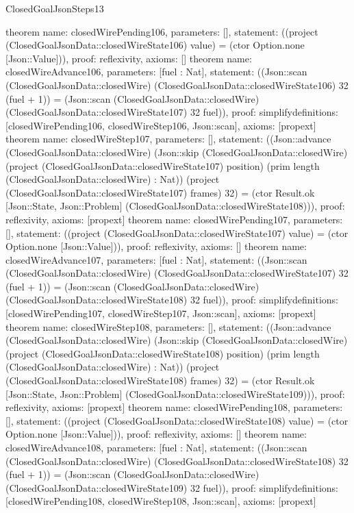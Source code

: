 \begin{lexlean}{ClosedGoalJsonSteps13}
\begin{semanticmodule}
{}
theorem{
 name: closedWirePending106, parameters: [],
 statement: ((project (ClosedGoalJsonData::closedWireState106) value) = (ctor Option.none [Json::Value])), proof: reflexivity{}, axioms: []
}
theorem{
 name: closedWireAdvance106, parameters: [fuel : Nat],
 statement: ((Json::scan (ClosedGoalJsonData::closedWire) (ClosedGoalJsonData::closedWireState106) 32 (fuel + 1)) = (Json::scan (ClosedGoalJsonData::closedWire) (ClosedGoalJsonData::closedWireState107) 32 fuel)), proof: simplify{definitions: [closedWirePending106, closedWireStep106, Json::scan]}, axioms: [propext]
}
theorem{
 name: closedWireStep107, parameters: [],
 statement: ((Json::advance (ClosedGoalJsonData::closedWire) (Json::skip (ClosedGoalJsonData::closedWire) (project (ClosedGoalJsonData::closedWireState107) position) (prim length (ClosedGoalJsonData::closedWire) : Nat)) (project (ClosedGoalJsonData::closedWireState107) frames) 32) = (ctor Result.ok [Json::State, Json::Problem] (ClosedGoalJsonData::closedWireState108))), proof: reflexivity{}, axioms: [propext]
}
theorem{
 name: closedWirePending107, parameters: [],
 statement: ((project (ClosedGoalJsonData::closedWireState107) value) = (ctor Option.none [Json::Value])), proof: reflexivity{}, axioms: []
}
theorem{
 name: closedWireAdvance107, parameters: [fuel : Nat],
 statement: ((Json::scan (ClosedGoalJsonData::closedWire) (ClosedGoalJsonData::closedWireState107) 32 (fuel + 1)) = (Json::scan (ClosedGoalJsonData::closedWire) (ClosedGoalJsonData::closedWireState108) 32 fuel)), proof: simplify{definitions: [closedWirePending107, closedWireStep107, Json::scan]}, axioms: [propext]
}
theorem{
 name: closedWireStep108, parameters: [],
 statement: ((Json::advance (ClosedGoalJsonData::closedWire) (Json::skip (ClosedGoalJsonData::closedWire) (project (ClosedGoalJsonData::closedWireState108) position) (prim length (ClosedGoalJsonData::closedWire) : Nat)) (project (ClosedGoalJsonData::closedWireState108) frames) 32) = (ctor Result.ok [Json::State, Json::Problem] (ClosedGoalJsonData::closedWireState109))), proof: reflexivity{}, axioms: [propext]
}
theorem{
 name: closedWirePending108, parameters: [],
 statement: ((project (ClosedGoalJsonData::closedWireState108) value) = (ctor Option.none [Json::Value])), proof: reflexivity{}, axioms: []
}
theorem{
 name: closedWireAdvance108, parameters: [fuel : Nat],
 statement: ((Json::scan (ClosedGoalJsonData::closedWire) (ClosedGoalJsonData::closedWireState108) 32 (fuel + 1)) = (Json::scan (ClosedGoalJsonData::closedWire) (ClosedGoalJsonData::closedWireState109) 32 fuel)), proof: simplify{definitions: [closedWirePending108, closedWireStep108, Json::scan]}, axioms: [propext]
}
\end{semanticmodule}
\end{lexlean}
